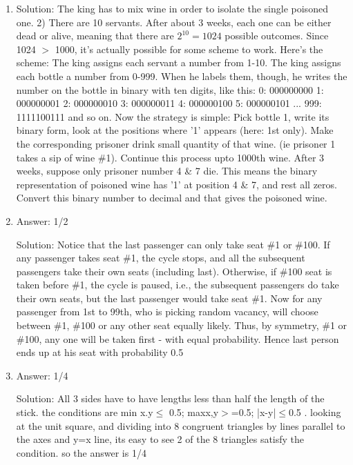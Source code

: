 \begin{enumerate}
\item
Solution: The king has to mix wine in order to isolate the single poisoned one. 2) There are 10 servants. After about 3 weeks, each one can be either dead or alive, meaning that there are $2^10 = 1024$ possible outcomes. Since 1024 $>$ 1000, it's actually possible for some scheme to work.
Here's the scheme: The king assigns each servant a number from 1-10. The king assigns each bottle a number from 0-999. When he labels them, though, he writes the number on the bottle in binary with ten digits, like this: 0: 000000000 1: 000000001 2: 000000010 3: 000000011 4: 000000100 5: 000000101 ... 999: 1111100111 and so on.
Now the strategy is simple: Pick bottle 1, write its binary form, look at the positions where '1' appears (here: 1st only). Make the corresponding prisoner drink small quantity of that wine. (ie prisoner 1 takes a sip of wine \#1). Continue this process upto 1000th wine. After 3 weeks, suppose only prisoner number 4 \& 7 die. This means the binary representation of poisoned wine has '1' at position 4 \& 7, and rest all zeros. Convert this binary number to decimal and that gives the poisoned wine.




\item
Answer: 1/2
 
Solution: Notice that the last passenger can only take seat \#1 or \#100. If any passenger takes seat \#1, the cycle stops, and all the subsequent passengers take their own seats (including last). Otherwise, if \#100 seat is taken before \#1, the cycle is paused, i.e., the subsequent passengers do take their own seats, but the last passenger would take seat \#1. Now for any passenger from 1st to 99th, who is picking random vacancy, will choose between \#1, \#100 or any other seat equally likely. Thus, by symmetry, \#1 or \#100, any one will be taken first - with equal probability. Hence last person ends up at his seat with probability 0.5




\item
Answer: 1/4
 
Solution: All 3 sides have to have lengths less than half the length of the stick. the conditions are min{ x.y}$\le$ 0.5; max{x,y}$>$=0.5; |x-y|$\le$0.5 . looking at the unit square, and dividing into 8 congruent triangles by lines parallel to the axes and y=x line, its easy to see 2 of the 8 triangles satisfy the condition. so the answer is 1/4




\end{enumerate}
